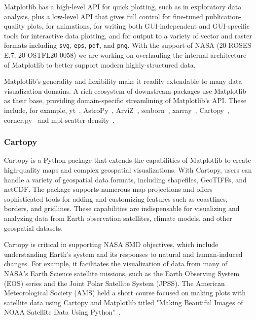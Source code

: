 \documentclass[12pt]{article}
\numberwithin{page}{section}
\begin{document}
Matplotlib has a high-level API for quick plotting, such as in exploratory data
analysis, plus a low-level API that gives full control for fine-tuned
publication-quality plots, for animations, for writing both GUI-independent and
GUI-specific tools for interactive data plotting, and for output to a variety
of vector and raster formats including \texttt{svg}, \texttt{eps},
\texttt{pdf}, and \texttt{png}.  With the support of NASA (20 ROSES E.7, 20-OSTFL20-0058)
we are working on overhauling the internal architecture of Matplotlib to better
support modern highly-structured data.

Matplotlib's generality and flexibility make it readily extendable to
many data visualization domains.  A rich ecosystem of downstream packages use
Matplotlib as their base, providing domain-specific streamlining of
Matplotlib's API.  These include, for example,
yt~\cite{2011ApJS..192....9T}, AstroPy~\cite{astropy:2013,
  astropy:2018}, ArviZ~\cite{arviz_2019},
seaborn~\cite{waskom2020seaborn}, xarray~\cite{hoyer2017xarray},
Cartopy~\cite{Cartopy}, corner.py~\cite{corner} and
mpl-scatter-density~\cite{mpl-scatter-density}.


\subsubsection{Cartopy}

Cartopy is a Python package that extends the capabilities of Matplotlib
to create high-quality maps and complex geospatial visualizations.
With Cartopy, users can handle a variety of geospatial data formats,
including shapefiles, GeoTIFFs, and netCDF.
The package supports numerous map projections and offers sophisticated tools for
adding and customizing features such as coastlines, borders, and gridlines.
These capabilities are indispensable for visualizing and analyzing data from
Earth observation satellites, climate models, and other geospatial datasets.

Cartopy is critical in supporting NASA SMD objectives,
which include understanding Earth's system and its responses to natural and human-induced changes.
For example, it facilitates the visualization of data from many of NASA's Earth Science satellite missions,
such as the Earth Observing System (EOS) series and the Joint Polar Satellite System (JPSS).
The American Meteorological Society (AMS) held a short course focused on making
plots with satellite data using Cartopy and Matplotlib titled
"Making Beautiful Images of NOAA Satellite Data Using Python"~\cite{noaa_short_course}.
\end{document}
